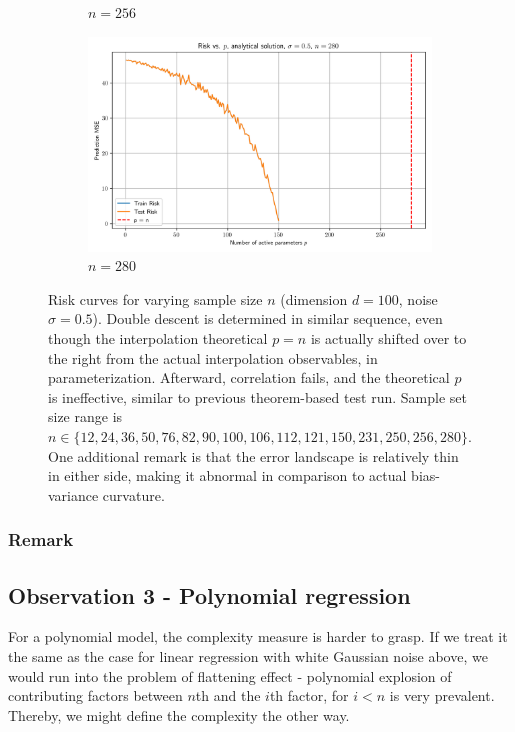 \documentclass{article}
\begin{document}
\begin{figure}[htb]
\begin{subfigure}[b]{\imgwidth}
    \caption{$n=256$}\label{fig:2o}
  \end{subfigure}%
  \hfill
  \begin{subfigure}[b]{\imgwidth}
    \includegraphics[width=\linewidth]{img2/risk_curve_n280.png}
    \caption{$n=280$}\label{fig:2p}
  \end{subfigure}

  \caption{Risk curves for varying sample size $n$ (dimension $d=100$, noise $\sigma=0.5$). Double descent is determined in similar sequence, even though the interpolation theoretical $p=n$ is actually shifted over to the right from the actual interpolation observables, in parameterization. Afterward, correlation fails, and the theoretical $p$ is ineffective, similar to previous theorem-based test run. Sample set size range is $n\in\{12,24,36,50,76,82,90,100,106,112,121,150,231,250,256,280\}$. One additional remark is that the error landscape is relatively thin in either side, making it abnormal in comparison to actual bias-variance curvature.}
  \label{fig:risk_all_grid}
\end{figure}

\subsubsection{Remark}


\subsection{Observation 3 - Polynomial regression}

For a polynomial model, the complexity measure is harder to grasp. If we treat it the same as the case for linear regression with white Gaussian noise above, we would run into the problem of flattening effect - polynomial explosion of contributing factors between $n$th and the $i$th factor, for $i<n$ is very prevalent. Thereby, we might define the complexity the other way. 
\end{document}

